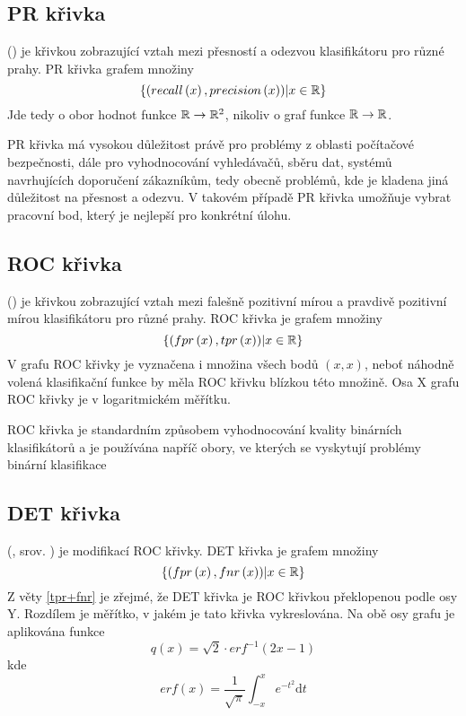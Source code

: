 \subsection{PR křivka}
 () je křivkou zobrazující vztah mezi přesností a odezvou klasifikátoru pro různé prahy. PR křivka grafem množiny
\[ \left\{ \left( recall \left( x \right), precision \left( x \right) \right) \middle| x \in \mathbb R \right\} \]
Jde tedy o obor hodnot funkce \( \mathbb R \to \mathbb R^2 \), nikoliv o graf funkce \( \mathbb R \to \mathbb R \).

PR křivka má vysokou důležitost právě pro problémy z oblasti počítačové bezpečnosti, dále pro vyhodnocování vyhledávačů, sběru dat, systémů navrhujících doporučení zákazníkům, tedy obecně problémů, kde je kladena jiná důležitost na přesnost a odezvu. V takovém případě PR křivka umožňuje vybrat pracovní bod, který je nejlepší pro konkrétní úlohu.

\subsection{ROC křivka}
 () je křivkou zobrazující vztah mezi falešně pozitivní mírou a pravdivě pozitivní mírou klasifikátoru pro různé prahy. ROC křivka je grafem množiny
\[ \left\{ \left( fpr \left( x \right), tpr \left( x \right) \right) \middle| x \in \mathbb R \right\} \]
V grafu ROC křivky je vyznačena i množina všech bodů \( \left( x, x \right) \), neboť náhodně volená klasifikační funkce by měla ROC křivku blízkou této množině. Osa X grafu ROC křivky je v logaritmickém měřítku.

ROC křivka je standardním způsobem vyhodnocování kvality binárních klasifikátorů a je používána napříč obory, ve kterých se vyskytují problémy binární klasifikace

\subsection{DET křivka}
 (, srov. \cite{martin_det_1997}) je modifikací ROC křivky. DET křivka je grafem množiny
\[ \left\{ \left( fpr \left( x \right), fnr \left( x \right) \right) \middle| x \in \mathbb R \right\} \]
Z věty \ref{tpr+fnr} je zřejmé, že DET křivka je ROC křivkou překlopenou podle osy Y. Rozdílem je měřítko, v jakém je tato křivka vykreslována. Na obě osy grafu je aplikována funkce 
\[ q \left( x \right) = \sqrt{2} \cdot erf^{-1} \left( 2x - 1 \right) \]
kde
\[ erf \left( x \right) = \frac{1}{\sqrt{\pi}} \int_{-x}^{x} e^{-t^2} \mathrm{d} t \]

